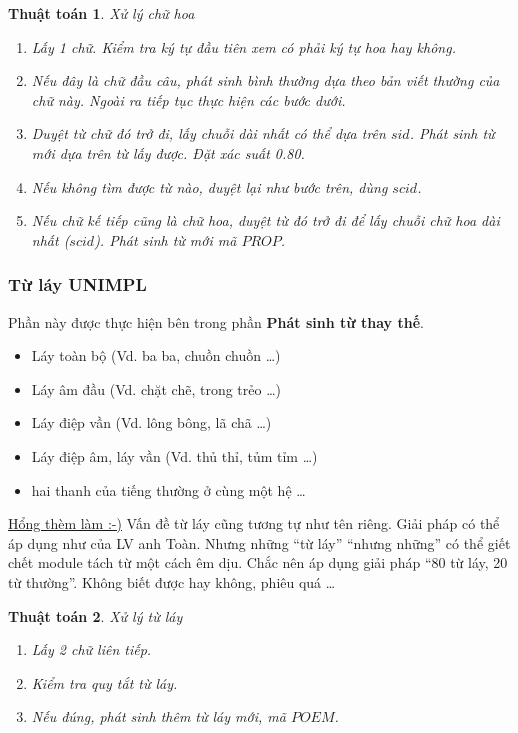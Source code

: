\documentclass[a4paper,oneside]{book} %
\newcommand{\note}[1]{\underline{#1}}
\newtheorem{algo}{Thuật toán}
\begin{document}
\begin{algo} Xử lý chữ hoa

\label{algo:propername}
  \begin{enumerate}
  \item Lấy 1 chữ. Kiểm tra ký tự đầu tiên xem có phải ký tự hoa hay
    không.
  \item Nếu đây là chữ đầu câu, phát sinh bình thường dựa theo bản
    viết thường của chữ này. Ngoài ra tiếp tục thực hiện các bước
    dưới.
  \item Duyệt từ chữ đó trở đi, lấy chuỗi dài nhất có thể dựa trên
    $sid$. Phát sinh từ mới dựa trên từ lấy được. Đặt xác suất 0.80.
  \item Nếu không tìm được từ nào, duyệt lại như bước trên, dùng
    $scid$.
  \item Nếu chữ kế tiếp cũng là chữ hoa, duyệt từ đó trở đi để lấy
    chuỗi chữ hoa dài nhất ($scid$). Phát sinh từ mới
    mã $PROP$. 
  \end{enumerate}
\end{algo}

\subsubsection{Từ láy UNIMPL}

Phần này được thực hiện bên trong phần \textbf{Phát sinh từ thay thế}.

\begin{itemize}
\item Láy toàn bộ (Vd. ba ba, chuồn chuồn \ldots)
\item Láy âm đầu (Vd. chặt chẽ, trong trẻo \ldots)
\item Láy điệp vần (Vd. lông bông, lã chã \ldots)
\item Láy điệp âm, láy vần (Vd. thủ thỉ, tủm tỉm \ldots)
\item hai thanh của tiếng thường ở cùng một hệ \ldots
\end{itemize}

\note{Hổng thèm làm :-)} Vấn đề từ láy cũng tương tự như  tên riêng. Giải
pháp có thể áp dụng như của LV anh Toàn. Nhưng những ``từ láy''
``nhưng những'' có thể giết chết module tách từ một cách êm dịu. Chắc
nên áp dụng giải pháp ``80 từ láy, 20 từ thường''. Không biết được hay
không, phiêu quá \ldots

\begin{algo} Xử lý từ láy

\label{algo:poem}
  \begin{enumerate}
  \item Lấy 2 chữ liên tiếp.
  \item Kiểm tra quy tắt từ láy.
  \item Nếu đúng, phát sinh thêm từ láy mới, mã $POEM$.
  \end{enumerate}
\end{algo}
\end{document}
